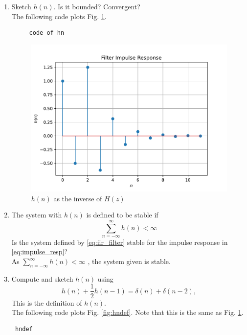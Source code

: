\documentclass[journal,12pt,twocolumn]{IEEEtran}
\renewcommand\thesection{\arabic{section}}
\begin{document}
\begin{enumerate}[label=\thesection.\arabic*]
\item Sketch $h(n)$. Is it bounded? Convergent? 
\\
\solution The following code plots Fig. \ref{fig:hn}.
\begin{lstlisting}
     code of hn
\end{lstlisting}
\begin{figure}[!ht]
\centering
\includegraphics[width=\columnwidth]{figs/q5/hn.pdf}
\caption{$h(n)$ as the inverse of $H(z)$}
\label{fig:hn}
\end{figure}
%
\item The system with $h(n)$ is defined to be stable if
\begin{equation}
\sum_{n=-\infty}^{\infty}h(n) < \infty
\end{equation}
Is the system defined by \eqref{eq:iir_filter} stable for the impulse response in \eqref{eq:impulse_resp}? \\
\solution
As $\sum_{n=-\infty}^{\infty}h(n) < \infty$ , the system given is stable.
\item 
Compute and sketch $h(n)$ using 
\begin{equation}
\label{eq:iir_filter_h}
h(n) + \frac{1}{2}h(n-1) = \delta(n) + \delta(n-2), 
\end{equation}
%
This is the definition of $h(n)$.
\\
\solution The following code plots Fig. \ref{fig:hndef}. Note that this is the same as Fig. 
\ref{fig:hn}. 
%
\begin{lstlisting}
 hndef
\end{lstlisting}
\begin{figure}[!ht]

\end{figure}
\end{enumerate}
\end{document}
